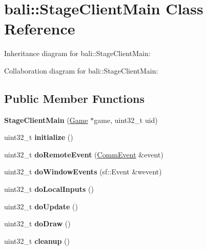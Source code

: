 \hypertarget{classbali_1_1_stage_client_main}{\section{bali\-:\-:Stage\-Client\-Main Class Reference}
\label{classbali_1_1_stage_client_main}
}


Inheritance diagram for bali\-:\-:Stage\-Client\-Main\-:


Collaboration diagram for bali\-:\-:Stage\-Client\-Main\-:
\subsection*{Public Member Functions}
\begin{DoxyCompactItemize}
\item 
\hypertarget{classbali_1_1_stage_client_main_a82c2f9687a1b9d88a31b233282aa2751}{{\bfseries Stage\-Client\-Main} (\hyperlink{classbali_1_1_game}{Game} $\ast$game, uint32\-\_\-t uid)}\label{classbali_1_1_stage_client_main_a82c2f9687a1b9d88a31b233282aa2751}

\item 
\hypertarget{classbali_1_1_stage_client_main_af9cae5755ed804fe0fdf7442e6643301}{uint32\-\_\-t {\bfseries initialize} ()}\label{classbali_1_1_stage_client_main_af9cae5755ed804fe0fdf7442e6643301}

\item 
\hypertarget{classbali_1_1_stage_client_main_a04a4e49ea402d3c83b84b49ba59033c5}{uint32\-\_\-t {\bfseries do\-Remote\-Event} (\hyperlink{classbali_1_1_comm_event}{Comm\-Event} \&event)}\label{classbali_1_1_stage_client_main_a04a4e49ea402d3c83b84b49ba59033c5}

\item 
\hypertarget{classbali_1_1_stage_client_main_a546a1f4718bfa98b6de8c3472ba1e6bb}{uint32\-\_\-t {\bfseries do\-Window\-Events} (sf\-::\-Event \&wevent)}\label{classbali_1_1_stage_client_main_a546a1f4718bfa98b6de8c3472ba1e6bb}

\item 
\hypertarget{classbali_1_1_stage_client_main_aacc564588ffea2c76294411476737dac}{uint32\-\_\-t {\bfseries do\-Local\-Inputs} ()}\label{classbali_1_1_stage_client_main_aacc564588ffea2c76294411476737dac}

\item 
\hypertarget{classbali_1_1_stage_client_main_a9e6429f7dc671a707d3171195993e7c4}{uint32\-\_\-t {\bfseries do\-Update} ()}\label{classbali_1_1_stage_client_main_a9e6429f7dc671a707d3171195993e7c4}

\item 
\hypertarget{classbali_1_1_stage_client_main_a5c4c18855a82496bed46f189cba8b52f}{uint32\-\_\-t {\bfseries do\-Draw} ()}\label{classbali_1_1_stage_client_main_a5c4c18855a82496bed46f189cba8b52f}

\item 
\hypertarget{classbali_1_1_stage_client_main_abdb3bbb2fdb60bf4e41c13aeae625fb3}{uint32\-\_\-t {\bfseries cleanup} ()}\label{classbali_1_1_stage_client_main_abdb3bbb2fdb60bf4e41c13aeae625fb3}

\end{DoxyCompactItemize}
